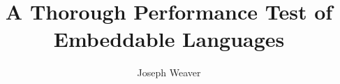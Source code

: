 \documentclass[twocolumn]{article}
\begin{document}
\title{A Thorough Performance Test of Embeddable Languages}
\author{Joseph Weaver}
\maketitle













\printbibliography
\end{document}
